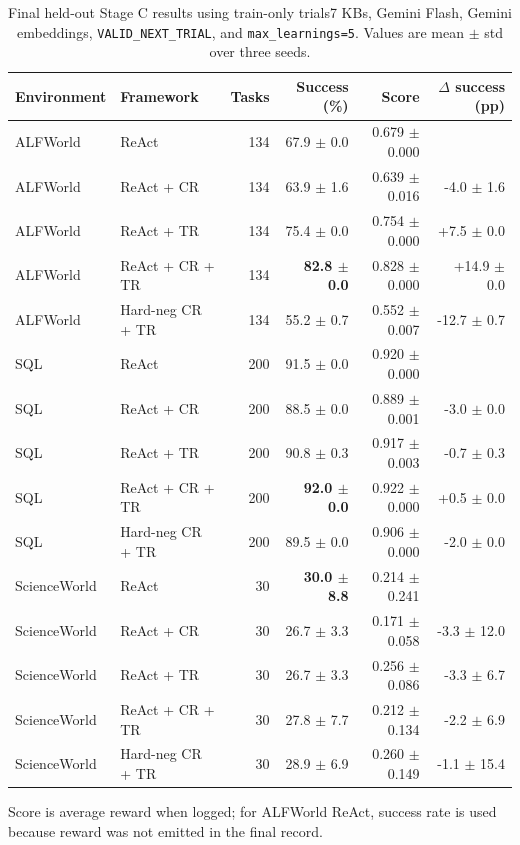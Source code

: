 \begin{table}[t]
\centering
\caption{Final held-out Stage C results using train-only trials7 KBs, Gemini Flash, Gemini embeddings, \texttt{VALID\_NEXT\_TRIAL}, and \texttt{max\_learnings=5}. Values are mean $\pm$ std over three seeds.}
\label{tab:final-main-results}
\begin{tabular}{llrrrr}
\toprule
Environment & Framework & Tasks & Success (\%) & Score & $\Delta$ success (pp) \\
\midrule
ALFWorld & ReAct & 134 & 67.9 $\pm$ 0.0 & 0.679 $\pm$ 0.000 & \textemdash{} \\
ALFWorld & ReAct + CR & 134 & 63.9 $\pm$ 1.6 & 0.639 $\pm$ 0.016 & -4.0 $\pm$ 1.6 \\
ALFWorld & ReAct + TR & 134 & 75.4 $\pm$ 0.0 & 0.754 $\pm$ 0.000 & +7.5 $\pm$ 0.0 \\
ALFWorld & ReAct + CR + TR & 134 & \textbf{82.8 $\pm$ 0.0} & 0.828 $\pm$ 0.000 & +14.9 $\pm$ 0.0 \\
ALFWorld & Hard-neg CR + TR & 134 & 55.2 $\pm$ 0.7 & 0.552 $\pm$ 0.007 & -12.7 $\pm$ 0.7 \\
\midrule
SQL & ReAct & 200 & 91.5 $\pm$ 0.0 & 0.920 $\pm$ 0.000 & \textemdash{} \\
SQL & ReAct + CR & 200 & 88.5 $\pm$ 0.0 & 0.889 $\pm$ 0.001 & -3.0 $\pm$ 0.0 \\
SQL & ReAct + TR & 200 & 90.8 $\pm$ 0.3 & 0.917 $\pm$ 0.003 & -0.7 $\pm$ 0.3 \\
SQL & ReAct + CR + TR & 200 & \textbf{92.0 $\pm$ 0.0} & 0.922 $\pm$ 0.000 & +0.5 $\pm$ 0.0 \\
SQL & Hard-neg CR + TR & 200 & 89.5 $\pm$ 0.0 & 0.906 $\pm$ 0.000 & -2.0 $\pm$ 0.0 \\
\midrule
ScienceWorld & ReAct & 30 & \textbf{30.0 $\pm$ 8.8} & 0.214 $\pm$ 0.241 & \textemdash{} \\
ScienceWorld & ReAct + CR & 30 & 26.7 $\pm$ 3.3 & 0.171 $\pm$ 0.058 & -3.3 $\pm$ 12.0 \\
ScienceWorld & ReAct + TR & 30 & 26.7 $\pm$ 3.3 & 0.256 $\pm$ 0.086 & -3.3 $\pm$ 6.7 \\
ScienceWorld & ReAct + CR + TR & 30 & 27.8 $\pm$ 7.7 & 0.212 $\pm$ 0.134 & -2.2 $\pm$ 6.9 \\
ScienceWorld & Hard-neg CR + TR & 30 & 28.9 $\pm$ 6.9 & 0.260 $\pm$ 0.149 & -1.1 $\pm$ 15.4 \\
\bottomrule
\end{tabular}
\vspace{2pt}
{\footnotesize Score is average reward when logged; for ALFWorld ReAct, success rate is used because reward was not emitted in the final record.}
\end{table}
